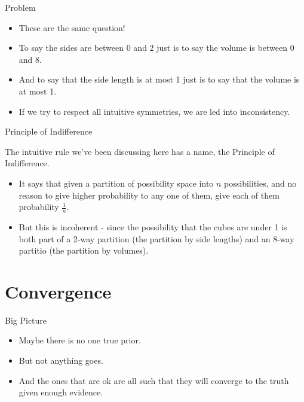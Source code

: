 \documentclass[
  ignorenonframetext,
]{beamer}
\providecommand{\tightlist}{%
  \setlength{\itemsep}{0pt}\setlength{\parskip}{0pt}}
\renewcommand{\,}{\text{, }}
\begin{document}
\begin{frame}{Problem}
\protect\hypertarget{problem}{}

\begin{itemize}
\tightlist
\item
  These are the same question!
\item
  To say the sides are between 0 and 2 just is to say the volume is
  between 0 and 8.
\item
  And to say that the side length is at most 1 just is to say that the
  volume is at most 1.
\item
  If we try to respect all intuitive symmetries, we are led into
  inconsistency.
\end{itemize}

\end{frame}

\begin{frame}{Principle of Indifference}
\protect\hypertarget{principle-of-indifference}{}

The intuitive rule we've been discussing here has a name, the Principle
of Indifference.

\begin{itemize}
\tightlist
\item
  It says that given a partition of possibility space into \(n\)
  possibilities, and no reason to give higher probability to any one of
  them, give each of them probability \(\frac{1}{n}\).
\item
  But this is incoherent - since the possibility that the cubes are
  under 1 is both part of a 2-way partition (the partition by side
  lengths) and an 8-way partitio (the partition by volumes).
\end{itemize}

\end{frame}

\hypertarget{convergence}{%
\section{Convergence}\label{convergence}}

\begin{frame}{Big Picture}
\protect\hypertarget{big-picture-1}{}

\begin{itemize}
\tightlist
\item
  Maybe there is no one true prior.
\item
  But not anything goes.
\item
  And the ones that are ok are all such that they will converge to the
  truth given enough evidence.
\end{itemize}

\end{frame}
\end{document}
